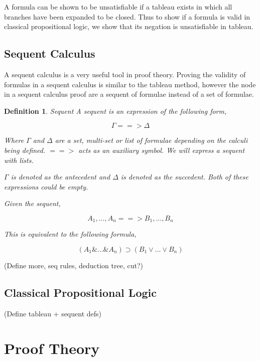 \documentclass{article}
\newtheorem{definition}{Definition}
\begin{document}
A formula can be shown to be unsatisfiable if a tableau exists in which all
branches have been expanded to be closed. Thus to show if a formula is valid in
classical propositional logic, we show that its negation is unsatisfiable in
tableau.

\subsection{Sequent Calculus}

A sequent calculus is a very useful tool in proof theory. Proving the validity
of formulas in a sequent calculus is similar to the tableau method, however the
node in a sequent calculus proof are a sequent of formulae instead of a set of
formulae.

\begin{definition}{Sequent}
A sequent is an expression of the following form,

\begin{equation*}
\Gamma ==> \Delta
\end{equation*}

Where $\Gamma$ and $\Delta$ are a set, multi-set or list of formulae depending
on the calculi being defined. $==>$ acts as an auxiliary symbol. We will
express a sequent with lists.

$\Gamma$ is denoted as the antecedent and $\Delta$ is denoted as the succedent.
Both of these expressions could be empty.

Given the sequent,

\begin{equation*}
A_1, \ldots, A_n ==> B_1, \ldots, B_n
\end{equation*}

This is equivalent to the following formula,

\begin{equation*}
(A_1 \& \ldots \& A_n) \supset (B_1 \vee \ldots \vee B_n)
\end{equation*}

\end{definition}

(Define more, seq rules, deduction tree, cut?)

\subsection{Classical Propositional Logic}

(Define tableau + sequent defs)

\section{Proof Theory}
\end{document}
